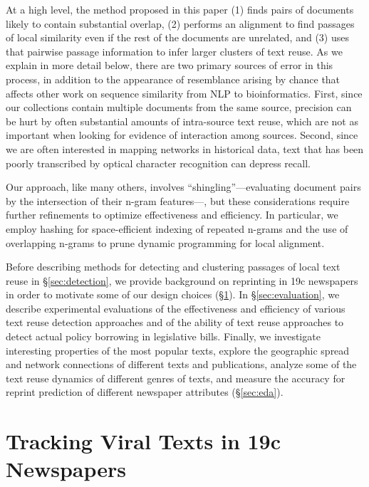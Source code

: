 \documentclass[pdftex,11pt]{article}
\begin{document}
At a high level, the method proposed in this paper (1) finds pairs of
documents likely to contain substantial overlap, (2) performs an
alignment to find passages of local similarity even if the rest of the
documents are unrelated, and (3) uses that pairwise passage
information to infer larger clusters of text reuse.  As we explain in
more detail below, there are two primary sources of error in this
process, in addition to the appearance of resemblance arising by
chance that affects other work on sequence similarity from NLP to
bioinformatics.  First, since our collections contain multiple
documents from the same source, precision can be hurt by often
substantial amounts of intra-source text reuse, which are not as
important when looking for evidence of interaction among sources.
Second, since we are often interested in mapping networks in
historical data, text that has been poorly transcribed by optical
character recognition can depress recall.

Our approach, like many others, involves ``shingling''---evaluating
document pairs by the intersection of their n-gram features---, but
these considerations require further refinements to optimize
effectiveness and efficiency.  In particular, we employ hashing for
space-efficient indexing of repeated n-grams and the use of
overlapping n-grams to prune dynamic programming for local alignment.

Before describing methods for detecting and clustering passages of
local text reuse in \S\ref{sec:detection}, we provide background on
reprinting in 19c newspapers in order to motivate some of our design
choices (\S\ref{sec:tracking-newspapers}).  In \S\ref{sec:evaluation}, we
describe experimental evaluations of the effectiveness and efficiency
of various text reuse detection approaches and of the ability of text
reuse approaches to detect actual policy borrowing in legislative
bills.  Finally, we investigate interesting properties of the most
popular texts, explore the geographic spread and network connections
of different texts and publications, analyze some of the text reuse
dynamics of different genres of texts, and measure the accuracy for
reprint prediction of different newspaper attributes
(\S\ref{sec:eda}).

\section{Tracking Viral Texts in 19c Newspapers}
\label{sec:tracking-newspapers}
\end{document}
